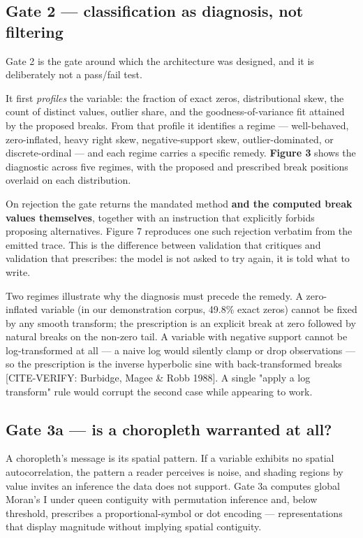 \subsection{Gate 2 --- classification as diagnosis, not filtering}
Gate 2 is the gate around which the architecture was designed, and it is deliberately not a pass/fail test.

It first \emph{profiles} the variable: the fraction of exact zeros, distributional skew, the count of distinct values, outlier share, and the goodness-of-variance fit attained by the proposed breaks. From that profile it identifies a regime --- well-behaved, zero-inflated, heavy right skew, negative-support skew, outlier-dominated, or discrete-ordinal --- and each regime carries a specific remedy. \textbf{Figure 3} shows the diagnostic across five regimes, with the proposed and prescribed break positions overlaid on each distribution.

On rejection the gate returns the mandated method \textbf{and the computed break values themselves}, together with an instruction that explicitly forbids proposing alternatives. Figure 7 reproduces one such rejection verbatim from the emitted trace. This is the difference between validation that critiques and validation that prescribes: the model is not asked to try again, it is told what to write.

Two regimes illustrate why the diagnosis must precede the remedy. A zero-inflated variable (in our demonstration corpus, 49.8\% exact zeros) cannot be fixed by any smooth transform; the prescription is an explicit break at zero followed by natural breaks on the non-zero tail. A variable with negative support cannot be log-transformed at all --- a naive log would silently clamp or drop observations --- so the prescription is the inverse hyperbolic sine with back-transformed breaks [CITE-VERIFY: Burbidge, Magee \& Robb 1988]. A single "apply a log transform" rule would corrupt the second case while appearing to work.

\subsection{Gate 3a --- is a choropleth warranted at all?}
A choropleth's message is its spatial pattern. If a variable exhibits no spatial autocorrelation, the pattern a reader perceives is noise, and shading regions by value invites an inference the data does not support. Gate 3a computes global Moran's I under queen contiguity with permutation inference and, below threshold, prescribes a proportional-symbol or dot encoding --- representations that display magnitude without implying spatial contiguity.


